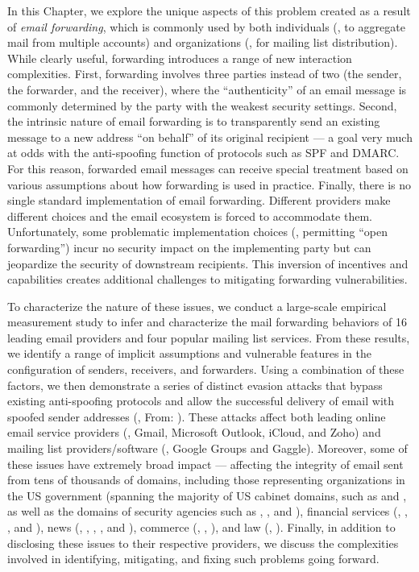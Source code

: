 In this Chapter, we explore the unique aspects of this problem created
as a result of \emph{email forwarding}, which is commonly used by both
individuals (\ie, to aggregate mail from multiple accounts) and
organizations (\ie, for mailing list distribution).  While clearly
useful, forwarding introduces a range of new interaction
complexities. First, forwarding involves three parties instead of two
(the sender, the forwarder, and the receiver), where the
``authenticity'' of an email message is commonly determined by the party with
the weakest security settings.  Second, the intrinsic nature of email
forwarding is to transparently send an existing message to a new
address ``on behalf'' of its original recipient --- a goal very much
at odds with the anti-spoofing function of protocols such as SPF and
DMARC.  For this reason, forwarded email messages can receive special
treatment based on various assumptions about how forwarding is used in
practice.  Finally, there is no single standard implementation of
email forwarding. Different providers make different choices and the
email ecosystem is forced to accommodate them.  Unfortunately, some
problematic implementation choices (\eg, permitting ``open
forwarding'') incur no security impact on the implementing party but
can jeopardize the security of downstream recipients.  This inversion of
incentives and capabilities creates additional challenges to
mitigating forwarding vulnerabilities.

To characterize the nature of these issues, we conduct a large-scale empirical
measurement study to infer and characterize the mail forwarding
behaviors of 16 leading email providers and four popular mailing
list services.  From these results, we identify a range of implicit
assumptions and vulnerable features in the
configuration of senders, receivers, and forwarders.  Using a
combination of these factors, we then demonstrate a series of distinct
evasion attacks that bypass existing anti-spoofing protocols and allow
the successful delivery of email with spoofed sender addresses (\eg,
From: ).  These attacks affect both leading
online email service providers (\eg, Gmail, Microsoft Outlook, iCloud, and
Zoho) and mailing list providers/software (\eg, Google Groups and
Gaggle).  Moreover, some of these issues have extremely broad
impact --- affecting the integrity of email sent from tens of
thousands of domains, including those representing organizations in the
US government (spanning the majority of US cabinet domains, such as
 and , as well as the domains of security agencies
such as , , and ), financial services
(\eg, , , and ), news (\eg,
,
,
, and ), commerce (\eg, , ), and law (\eg,
).
Finally, in addition to disclosing these issues to their respective
providers, we discuss the complexities involved in identifying,
mitigating, and fixing such problems going forward.

